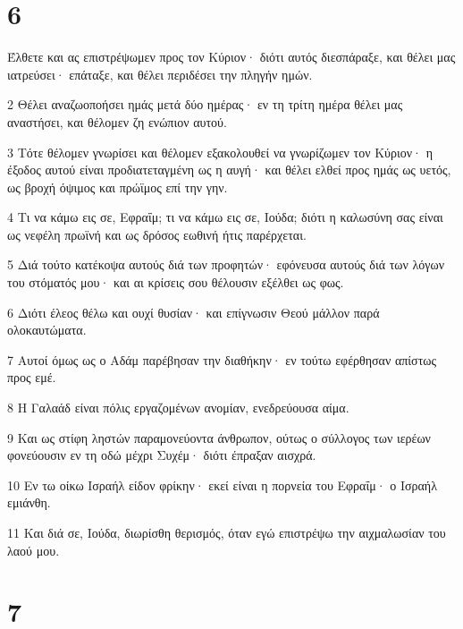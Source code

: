 \chapter{6}

\par Έλθετε και ας επιστρέψωμεν προς τον Κύριον· διότι αυτός διεσπάραξε, και θέλει μας ιατρεύσει· επάταξε, και θέλει περιδέσει την πληγήν ημών.
\par 2 Θέλει αναζωοποήσει ημάς μετά δύο ημέρας· εν τη τρίτη ημέρα θέλει μας αναστήσει, και θέλομεν ζη ενώπιον αυτού.
\par 3 Τότε θέλομεν γνωρίσει και θέλομεν εξακολουθεί να γνωρίζωμεν τον Κύριον· η έξοδος αυτού είναι προδιατεταγμένη ως η αυγή· και θέλει ελθεί προς ημάς ως υετός, ως βροχή όψιμος και πρώϊμος επί την γην.
\par 4 Τι να κάμω εις σε, Εφραΐμ; τι να κάμω εις σε, Ιούδα; διότι η καλωσύνη σας είναι ως νεφέλη πρωϊνή και ως δρόσος εωθινή ήτις παρέρχεται.
\par 5 Διά τούτο κατέκοψα αυτούς διά των προφητών· εφόνευσα αυτούς διά των λόγων του στόματός μου· και αι κρίσεις σου θέλουσιν εξέλθει ως φως.
\par 6 Διότι έλεος θέλω και ουχί θυσίαν· και επίγνωσιν Θεού μάλλον παρά ολοκαυτώματα.
\par 7 Αυτοί όμως ως ο Αδάμ παρέβησαν την διαθήκην· εν τούτω εφέρθησαν απίστως προς εμέ.
\par 8 Η Γαλαάδ είναι πόλις εργαζομένων ανομίαν, ενεδρεύουσα αίμα.
\par 9 Και ως στίφη ληστών παραμονεύοντα άνθρωπον, ούτως ο σύλλογος των ιερέων φονεύουσιν εν τη οδώ μέχρι Συχέμ· διότι έπραξαν αισχρά.
\par 10 Εν τω οίκω Ισραήλ είδον φρίκην· εκεί είναι η πορνεία του Εφραΐμ· ο Ισραήλ εμιάνθη.
\par 11 Και διά σε, Ιούδα, διωρίσθη θερισμός, όταν εγώ επιστρέψω την αιχμαλωσίαν του λαού μου.

\chapter{7}

